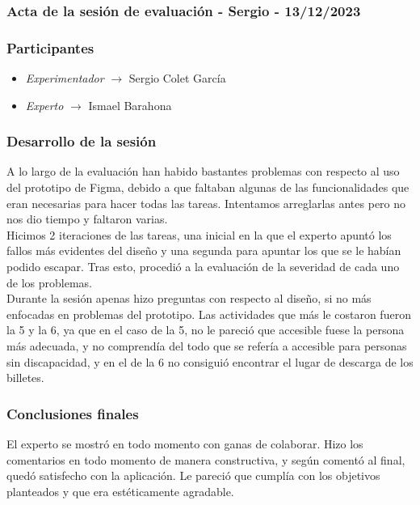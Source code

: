 \subsubsection{Acta de la sesión de evaluación - Sergio - 13/12/2023}
\subsubsection{Participantes}
\begin{itemize}
    \item \textit{Experimentador} $\rightarrow$ Sergio Colet García
    \item \textit{Experto} $\rightarrow$ Ismael Barahona
\end{itemize}

\subsubsection{Desarrollo de la sesión}
A lo largo de la evaluación han habido bastantes problemas con respecto al uso del prototipo de Figma, debido a que faltaban algunas de las funcionalidades que 
eran necesarias para hacer todas las tareas. Intentamos arreglarlas antes pero no nos dio tiempo y faltaron varias. \\

Hicimos 2 iteraciones de las tareas, una inicial en la que el experto apuntó los fallos más evidentes del diseño y una segunda para apuntar los que se le habían 
podido escapar. Tras esto, procedió a la evaluación de la severidad de cada uno de los problemas. \\

Durante la sesión apenas hizo preguntas con respecto al diseño, si no más enfocadas en problemas del prototipo. Las actividades que más le costaron fueron la 5 y 
la 6, ya que en el caso de la 5, no le pareció que accesible fuese la persona más adecuada, y no comprendía del todo que se refería a accesible para personas sin 
discapacidad, y en el de la 6 no consiguió encontrar el lugar de descarga de los billetes.

\subsubsection{Conclusiones finales}
El experto se mostró en todo momento con ganas de colaborar. Hizo los comentarios en todo momento de manera constructiva, y según comentó al final, quedó satisfecho 
con la aplicación. Le pareció que cumplía con los objetivos planteados y que era estéticamente agradable.

